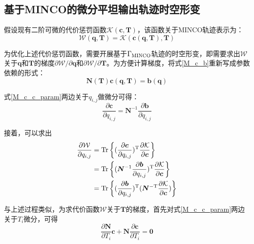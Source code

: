 \subsection{基于MINCO的微分平坦输出轨迹时空形变}
假设现有二阶可微的代价惩罚函数$\mathcal{K}\left( \boldsymbol{c}, \boldsymbol{T}\right)$，该函数关于MINCO轨迹表示为：
\begin{equation}
    \mathcal{W}(\boldsymbol{q},\boldsymbol{T})=\mathcal{K}(\boldsymbol{c}(\boldsymbol{q},\boldsymbol{T}),\boldsymbol{T})
\end{equation}

为优化上述代价惩罚函数，需要开展基于$\Gamma_{\rm{MINCO}}$轨迹的时空形变，即需要求出$\mathcal{W}$关于$\boldsymbol{q}$和$\boldsymbol{T}$的梯度$\partial\mathcal{W}/\partial\boldsymbol{q}$和$\partial \mathcal{W}/\partial\boldsymbol{T}$。为方便计算梯度，将式\ref{M_c_b}重新写成参数依赖的形式：
\begin{equation}\label{M_c_c_param}
    \boldsymbol{N}(\boldsymbol{T})\boldsymbol{c}(\boldsymbol{q},\boldsymbol{T})=\boldsymbol{b}(\boldsymbol{q})
\end{equation}

式\ref{M_c_c_param}两边关于$q_{i,j}$做微分可得：
\begin{equation}
    \frac{\partial{\boldsymbol{c}}}{\partial{q_{i,j}}} = \boldsymbol{N}^{-1}\frac{\partial{\boldsymbol{b}}}{\partial{q_{i,j}}}
\end{equation}

接着，可以求出
\begin{equation}
\begin{aligned}\label{partial_q_i_j}
    \frac{\partial\mathcal{W}}{\partial q_{i,j}} &= {\rm{Tr}}
    \left\{(\frac{\partial\boldsymbol{c}}{\partial q _{i,j}})^{\rm{T}}\frac{\partial\mathcal{K}}{\partial\boldsymbol{c}} \right\} \\
    &= {\rm{Tr}}\left\{
    (\boldsymbol{N}^{-1} \frac{\partial\boldsymbol{b}}{\partial q_{i,j}})^{\rm{T}} \frac{\partial \mathcal{K}}{\partial \boldsymbol{c}}
    \right\}\\
    &={\rm{Tr}}\left\{ 
    (\frac{\partial\boldsymbol{b}}{\partial q_{i,j}})^{\rm{T}}(\boldsymbol{N}^{\rm{-T}}\frac{\partial \mathcal{K}}{\partial \boldsymbol{c}})
    \right\}
\end{aligned}
\end{equation}

与上述过程类似，为求代价函数$\mathcal{W}$关于$\boldsymbol{T}$的梯度，首先对式\ref{M_c_c_param}两边关于$T_i$微分，可得
\begin{equation}
    \frac{\partial \boldsymbol{N}}{\partial T_i}\boldsymbol{c} + \boldsymbol{N} \frac{\partial \boldsymbol{c}}{\partial T_i}=\boldsymbol{0}
\end{equation}

